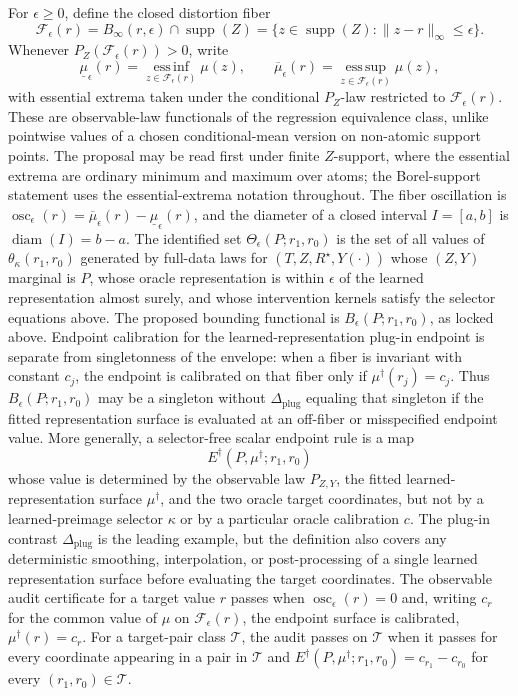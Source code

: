 \documentclass[11pt]{article}
\theoremstyle{definition}
\theoremstyle{plain}
\theoremstyle{remark}
\begin{document}
For \(\epsilon\ge0\), define the closed distortion fiber
\[
\mathcal F_\epsilon(r)=B_\infty(r,\epsilon)\cap\operatorname{supp}(Z)
=\{z\in\operatorname{supp}(Z):\|z-r\|_\infty\le\epsilon\}.
\]
Whenever \(P_Z(\mathcal F_\epsilon(r))>0\), write
\[
\underline\mu_\epsilon(r)=\operatorname*{ess\,inf}_{z\in\mathcal F_\epsilon(r)}\mu(z),
\qquad
\overline\mu_\epsilon(r)=\operatorname*{ess\,sup}_{z\in\mathcal F_\epsilon(r)}\mu(z),
\]
with essential extrema taken under the conditional \(P_Z\)-law restricted to \(\mathcal F_\epsilon(r)\).  These are observable-law functionals of the regression equivalence class, unlike pointwise values of a chosen conditional-mean version on non-atomic support points.  The proposal may be read first under finite \(Z\)-support, where the essential extrema are ordinary minimum and maximum over atoms; the Borel-support statement uses the essential-extrema notation throughout.
The fiber oscillation is \(\operatorname{osc}_\epsilon(r)=\overline\mu_\epsilon(r)-\underline\mu_\epsilon(r)\), and the diameter of a closed interval \(I=[a,b]\) is \(\operatorname{diam}(I)=b-a\).
The identified set \(\Theta_\epsilon(P;r_1,r_0)\) is the set of all values of \(\theta_\kappa(r_1,r_0)\) generated by full-data laws for \((T,Z,R^\star,Y(\cdot))\) whose \((Z,Y)\) marginal is \(P\), whose oracle representation is within \(\epsilon\) of the learned representation almost surely, and whose intervention kernels satisfy the selector equations above.  The proposed bounding functional is \(B_\epsilon(P;r_1,r_0)\), as locked above.  Endpoint calibration for the learned-representation plug-in endpoint is separate from singletonness of the envelope: when a fiber is invariant with constant \(c_j\), the endpoint is calibrated on that fiber only if \(\mu^\dagger(r_j)=c_j\).  Thus \(B_\epsilon(P;r_1,r_0)\) may be a singleton without \(\Delta_{\mathrm{plug}}\) equaling that singleton if the fitted representation surface is evaluated at an off-fiber or misspecified endpoint value.
More generally, a selector-free scalar endpoint rule is a map
\[
E^\dagger(P,\mu^\dagger;r_1,r_0)
\]
whose value is determined by the observable law \(P_{Z,Y}\), the fitted learned-representation surface \(\mu^\dagger\), and the two oracle target coordinates, but not by a learned-preimage selector \(\kappa\) or by a particular oracle calibration \(c\).  The plug-in contrast \(\Delta_{\mathrm{plug}}\) is the leading example, but the definition also covers any deterministic smoothing, interpolation, or post-processing of a single learned representation surface before evaluating the target coordinates.  The observable audit certificate for a target value \(r\) passes when \(\operatorname{osc}_\epsilon(r)=0\) and, writing \(c_r\) for the common value of \(\mu\) on \(\mathcal F_\epsilon(r)\), the endpoint surface is calibrated, \(\mu^\dagger(r)=c_r\).  For a target-pair class \(\mathcal T\), the audit passes on \(\mathcal T\) when it passes for every coordinate appearing in a pair in \(\mathcal T\) and \(E^\dagger(P,\mu^\dagger;r_1,r_0)=c_{r_1}-c_{r_0}\) for every \((r_1,r_0)\in\mathcal T\).
\end{document}
